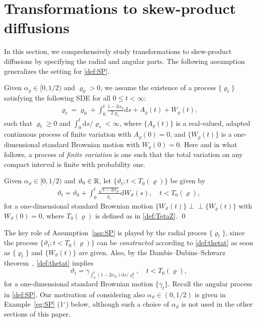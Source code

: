 \documentclass[12pt, twoside]{article}
\numberwithin{figure}{section}
\newcommand{\1}{\mathds 1}
\newcommand{\ind}{{\perp\!\!\!\perp}}
\renewcommand{\d}{{\mathrm d}}
\newcommand{\R}{{\Bbb R}}
\newcommand{\2}{{\mathbf 1}}
\newcommand{\cc}{{^\circ}}
\begin{document}
\section{Transformations to skew-product diffusions}\label{sec:SP}
In this section, we comprehensively study transformations to skew-product diffusions by specifying the radial and angular parts. The following assumption generalizes the setting for \eqref{def:SP}.

\begin{ass}\label{ass:SP}
Given $\alpha_\varrho\in [0,1/2)$ and $\varrho_0>0$, we assume the existence of a process $\{\varrho_t\}$ satisfying the following SDE for all $0\leq t<\infty$:
\begin{align}
\varrho_t
=\varrho_0+\int_0^t  \frac{1-2\alpha_\varrho}{2\varrho_s}\d s+A_\varrho(t)+W_\varrho(t),\label{def:genrhot}
\end{align}
such that $\varrho_t\geq 0$ and $\int_0^t \d s/\varrho_s<\infty$, where $\{A_\varrho(t)\}$ is a real-valued, adapted continuous process of finite variation with $A_\varrho(0)=0$, and $\{W_\varrho(t)\}$ is a one-dimensional standard Brownian motion with $W_\varrho(0)=0$. Here and in what follows, a process of \emph{finite variation} is one such that the total variation on any compact interval is finite with probability one.

Given $\alpha_\vartheta\in [0,1/2)$ and $\vartheta_0\in \R$, let $\{\vartheta_t;t<T_0(\varrho)\}$ be given  by
\begin{align}\label{def:thetat}
\vartheta_t=\vartheta_0+\int_0^t\frac{ \sqrt{1-2\alpha_\vartheta}}{\varrho_s} \d W_\vartheta(s),\quad t<T_0(\varrho),
\end{align}
for a one-dimensional standard Brownian motion $\{W_\vartheta(t)\}\ind \{W_\varrho(t)\}$ with $W_\vartheta(0)=0$, where $T_0(\varrho)$ is defined as in \eqref{def:TetaZ}.
\qed 
\end{ass}

The key role of Assumption~\ref{ass:SP} is played by the radial proces $\{\varrho_t\}$, since
the process $\{\vartheta_t;t<T_0(\varrho)\}$ can be \emph{constructed} according to \eqref{def:thetat} as soon as $\{\varrho_t\}$ and $\{W_\vartheta(t)\}$ are given. Also, 
by the Dambis--Dubins--Schwarz theorem~\cite[(1.6) Theorem on p.181]{RY}, \eqref{def:thetat} implies 
\[
\vartheta_t=\gamma_{\int_0^t (1-2\alpha_\vartheta) \d s/\varrho_s^2}, \quad t<T_0(\varrho), 
\]
for a one-dimensional standard Brownian motion $\{\gamma_t\}$. Recall the angular process in \eqref{def:SP}. Our motivation of considering also $\alpha_\vartheta\in (0,1/2)$ is given in Example~\ref{eg:SP} (1$\cc$) below, although such a choice of $\alpha_\vartheta$ is not used in the other sections of this paper.
\end{document}
